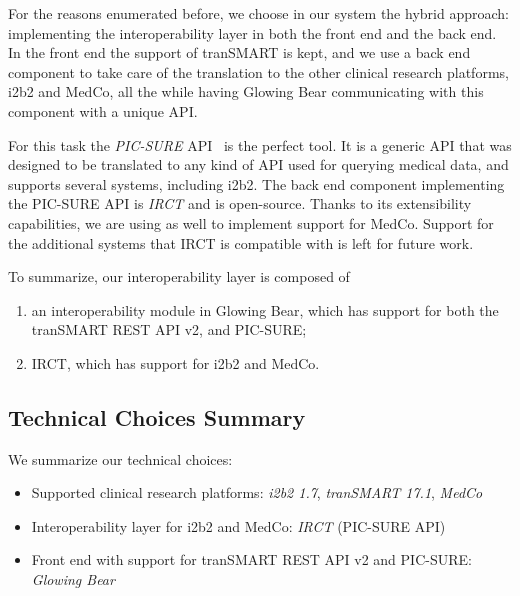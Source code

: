 For the reasons enumerated before, we choose in our system the hybrid approach: implementing the interoperability layer in both the front end and the back end.
In the front end the support of tranSMART is kept, and we use a back end component to take care of the translation to the other clinical research platforms, i2b2 and MedCo, all the while having Glowing Bear communicating with this component with a unique API.

For this task the \emph{PIC-SURE} API~\cite{todo} is the perfect tool.
It is a generic API that was designed to be translated to any kind of API used for querying medical data, and supports several systems, including i2b2.
The back end component implementing the PIC-SURE API is \emph{IRCT} and is open-source.
Thanks to its extensibility capabilities, we are using as well to implement support for MedCo.
Support for the additional systems that IRCT is compatible with is left for future work.

To summarize, our interoperability layer is composed of 
\begin{enumerate}
    \item an interoperability module in  Glowing Bear, which has support for both the tranSMART REST API v2, and PIC-SURE;
    \item IRCT, which has support for i2b2 and MedCo.
\end{enumerate} 


\subsection{Technical Choices Summary}

We summarize our technical choices:

\begin{itemize}
    \setlength\itemsep{0em}
    \item Supported clinical research platforms: \emph{i2b2 1.7}, \emph{tranSMART 17.1}, \emph{MedCo}
    \item Interoperability layer for i2b2 and MedCo: \emph{IRCT} (PIC-SURE API)
    \item Front end with support for tranSMART REST API v2 and PIC-SURE: \emph{Glowing Bear}
\end{itemize}


